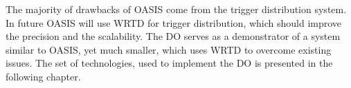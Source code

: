     The majority of drawbacks of OASIS come from the trigger distribution system. In future OASIS will use WRTD for trigger distribution, which should improve the precision and the scalability. The DO serves as a demonstrator of a system similar to OASIS, yet much smaller, which uses WRTD to overcome existing issues. The set of technologies, used to implement the DO is presented in the following chapter.




